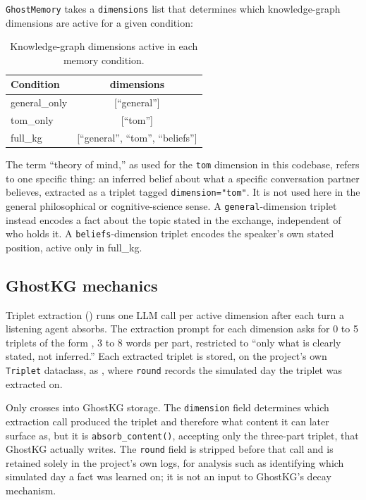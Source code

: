 \documentclass[11pt,a4paper]{article}
\newcommand{\cond}[1]{\textsf{#1}}
\begin{document}
\texttt{GhostMemory} takes a \texttt{dimensions} list that determines which knowledge-graph dimensions are active for a given condition:

\begin{table}[htbp]
\centering
\small
\caption{Knowledge-graph dimensions active in each memory condition.}
\label{tab:dims}
\begin{tabular}{lc}
\toprule
Condition & dimensions \\
\midrule
\cond{general\_only} & [``general''] \\
\cond{tom\_only} & [``tom''] \\
\cond{full\_kg} & [``general'', ``tom'', ``beliefs''] \\
\bottomrule
\end{tabular}
\end{table}

The term ``theory of mind,'' as used for the \texttt{tom} dimension in this codebase, refers to one specific thing: an inferred belief about what a specific conversation partner believes, extracted as a  triplet tagged \texttt{dimension="tom"}. It is not used here in the general philosophical or cognitive-science sense. A \texttt{general}-dimension triplet instead encodes a fact about the topic stated in the exchange, independent of who holds it. A \texttt{beliefs}-dimension triplet encodes the speaker's own stated position, active only in \cond{full\_kg}.

\subsection{GhostKG mechanics}\label{sec:3.4}

Triplet extraction () runs one LLM call per active dimension after each turn a listening agent absorbs. The extraction prompt for each dimension asks for 0 to 5 triplets of the form , 3 to 8 words per part, restricted to ``only what is clearly stated, not inferred.'' Each extracted triplet is stored, on the project's own \texttt{Triplet} dataclass, as , where \texttt{round} records the simulated day the triplet was extracted on.

Only  crosses into GhostKG storage. The \texttt{dimension} field determines which extraction call produced the triplet and therefore what content it can later surface as, but it is \texttt{absorb\_content()}, accepting only the three-part triplet, that GhostKG actually writes. The \texttt{round} field is stripped before that call and is retained solely in the project's own logs, for analysis such as identifying which simulated day a fact was learned on; it is not an input to GhostKG's decay mechanism.
\end{document}
